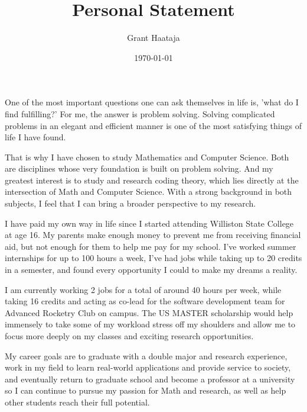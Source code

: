 \documentclass[11pt,final,twoside]{article} %
\title{Personal Statement}
\author{Grant Haataja}
\date{\today}
\begin{document}
	\maketitle

One of the most important questions one can ask themselves in life is, 'what do I find fulfilling?' For me, the answer is problem solving. Solving complicated problems in an elegant and efficient manner is one of the most satisfying things of life I have found. 
 
That is why I have chosen to study Mathematics and Computer Science. Both are disciplines whose very foundation is built on problem solving. And my greatest interest is to study and research coding theory, which lies directly at the intersection of Math and Computer Science. With a strong background in both subjects, I feel that I can bring a broader perspective to my research.

I have paid my own way in life since I started attending Williston State College at age 16. My parents make enough money to prevent me from receiving financial aid, but not enough for them to help me pay for my school. I’ve worked summer internships for up to 100 hours a week, I’ve had jobs while taking up to 20 credits in a semester, and found every opportunity I could to make my dreams a reality. 

I am currently working 2 jobs for a total of around 40 hours per week, while taking 16 credits and acting as co-lead for the software development team for Advanced Rocketry Club on campus. The US MASTER scholarship would help immensely to take some of my workload stress off my shoulders and allow me to focus more deeply on my classes and exciting research opportunities. 

My career goals are to graduate with a double major and research experience, work in my field to learn real-world applications and provide service to society, and eventually return to graduate school and become a professor at a university so I can continue to pursue my passion for Math and research, as well as help other students reach their full potential.
\end{document}
